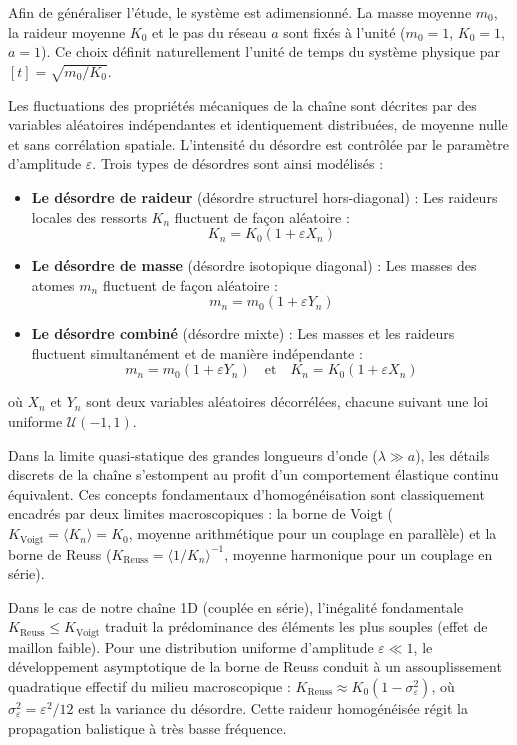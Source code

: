 Afin de généraliser l'étude, le système est adimensionné. La masse moyenne $m_0$, la raideur moyenne $K_0$ et le pas du réseau $a$ sont fixés à l'unité ($m_0 = 1$, $K_0 = 1$, $a = 1$). Ce choix définit naturellement l'unité de temps du système physique par $[t] = \sqrt{m_0/K_0}$. 

Les fluctuations des propriétés mécaniques de la chaîne sont décrites par des variables aléatoires indépendantes et identiquement distribuées, de moyenne nulle et sans corrélation spatiale. L'intensité du désordre est contrôlée par le paramètre d'amplitude $\varepsilon$. Trois types de désordres sont ainsi modélisés :
\begin{itemize}
    \item \textbf{Le désordre de raideur} (désordre structurel hors-diagonal) : Les raideurs locales des ressorts $K_n$ fluctuent de façon aléatoire :
    \begin{equation*}
        K_n = K_0 (1 + \varepsilon X_n)
    \end{equation*}
    \item \textbf{Le désordre de masse} (désordre isotopique diagonal) : Les masses des atomes $m_n$ fluctuent de façon aléatoire :
    \begin{equation*}
        m_n = m_0 (1 + \varepsilon Y_n)
    \end{equation*}
    \item \textbf{Le désordre combiné} (désordre mixte) : Les masses et les raideurs fluctuent simultanément et de manière indépendante :
    \begin{equation*}
        m_n = m_0 (1 + \varepsilon Y_n) \quad \text{et} \quad K_n = K_0 (1 + \varepsilon X_n)
    \end{equation*}
\end{itemize}
où $X_n$ et $Y_n$ sont deux variables aléatoires décorrélées, chacune suivant une loi uniforme $\mathcal{U}(-1, 1)$.

Dans la limite quasi-statique des grandes longueurs d'onde ($\lambda \gg a$), les détails discrets de la chaîne s'estompent au profit d'un comportement élastique continu équivalent. Ces concepts fondamentaux d'homogénéisation sont classiquement encadrés par deux limites macroscopiques : la borne de Voigt ($K_{\text{Voigt}} = \langle K_n \rangle = K_0$, moyenne arithmétique pour un couplage en parallèle) et la borne de Reuss ($K_{\text{Reuss}} = \langle 1/K_n \rangle^{-1}$, moyenne harmonique pour un couplage en série). 

Dans le cas de notre chaîne 1D (couplée en série), l'inégalité fondamentale $K_{\text{Reuss}} \le K_{\text{Voigt}}$ traduit la prédominance des éléments les plus souples (effet de maillon faible). Pour une distribution uniforme d'amplitude $\varepsilon \ll 1$, le développement asymptotique de la borne de Reuss conduit à un assouplissement quadratique effectif du milieu macroscopique : $K_{\text{Reuss}} \approx K_0 ( 1 - \sigma_{\varepsilon}^2 )$, où $\sigma_{\varepsilon}^2 = \varepsilon^2/12$ est la variance du désordre. Cette raideur homogénéisée régit la propagation balistique à très basse fréquence.

